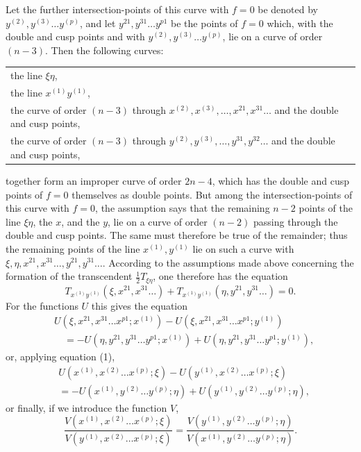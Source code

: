 \documentclass[10pt]{article}
\begin{document}
Let the further intersection-points of this curve with \(f=0\) be denoted by \(y^{(2)},y^{(3)}\ldots y^{(p)}\), and let \(y^{21},y^{31}\ldots y^{p1}\) be the points of \(f=0\) which, with the double and cusp points and with \(y^{(2)},y^{(3)}\ldots y^{(p)}\), lie on a curve of order \((n-3)\). Then the following curves:
\begin{center}
\begin{tabular}{@{}p{5.15in}@{}}
the line \(\xi\eta\),\\
the line \(x^{(1)}y^{(1)}\),\\
the curve of order \((n-3)\) through \(x^{(2)},x^{(3)},\ldots,x^{21},x^{31}\ldots\) and the double and cusp points,\\
the curve of order \((n-3)\) through \(y^{(2)},y^{(3)},\ldots,y^{31},y^{32}\ldots\) and the double and cusp points,
\end{tabular}
\end{center}
together form an improper curve of order \(2n-4\), which has the double and cusp points of \(f=0\) themselves as double points. But among the intersection-points of this curve with \(f=0\), the assumption says that the remaining \(n-2\) points of the line \(\xi\eta\), the \(x\), and the \(y\), lie on a curve of order \((n-2)\) passing through the double and cusp points. The same must therefore be true of the remainder; thus the remaining points of the line \(x^{(1)},y^{(1)}\) lie on such a curve with \(\xi,\eta,x^{21},x^{31}\ldots,y^{21},y^{31}\ldots\). According to the assumptions made above concerning the formation of the transcendent \(\frac12T_{\xi\eta}\), one therefore has the equation
\[
T_{x^{(1)}y^{(1)}}(\xi,x^{21},x^{31}\ldots)+T_{x^{(1)}y^{(1)}}(\eta,y^{21},y^{31}\ldots)=0.
\]
For the functions \(U\) this gives the equation
\[
\begin{aligned}
&U(\xi,x^{21},x^{31}\ldots x^{p1};x^{(1)})-U(\xi,x^{21},x^{31}\ldots x^{p1};y^{(1)})\\
&\quad=-U(\eta,y^{21},y^{31}\ldots y^{p1};x^{(1)})+U(\eta,y^{21},y^{31}\ldots y^{p1};y^{(1)}),
\end{aligned}
\]
or, applying equation (1),
\[
\begin{aligned}
&U(x^{(1)},x^{(2)}\ldots x^{(p)};\xi)-U(y^{(1)},x^{(2)}\ldots x^{(p)};\xi)\\
&
=-U(x^{(1)},y^{(2)}\ldots y^{(p)};\eta)+U(y^{(1)},y^{(2)}\ldots y^{(p)};\eta),
\end{aligned}
\]
or finally, if we introduce the function \(V\),
\[
\tag{3}\frac{V(x^{(1)},x^{(2)}\ldots x^{(p)};\xi)}{V(y^{(1)},x^{(2)}\ldots x^{(p)};\xi)}
=\frac{V(y^{(1)},y^{(2)}\ldots y^{(p)};\eta)}{V(x^{(1)},y^{(2)}\ldots y^{(p)};\eta)}.
\]
\end{document}
